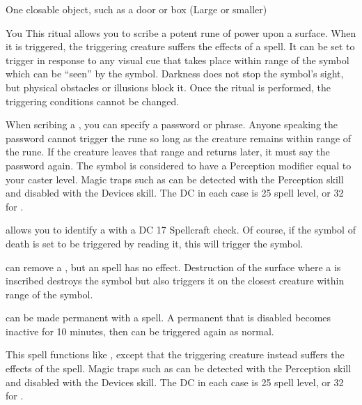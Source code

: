 \begin{spelltarget}{One closable object, such as a door or box (Large or smaller)}
\begin{spelltarget}{You}
\spelleffect This ritual allows you to scribe a potent rune of power upon a surface. When it is triggered, the triggering creature suffers the effects of a  spell. It can be set to trigger in response to any visual cue that takes place within \rngclose range of the symbol which can be ``seen'' by the symbol. Darkness does not stop the symbol's sight, but physical obstacles or illusions block it. Once the ritual is performed, the triggering conditions cannot be changed.
\par When scribing a , you can specify a password or phrase. Anyone speaking the password cannot trigger the rune so long as the creature remains within \rngmed range of the rune. If the creature leaves that range and returns later, it must say the password again.
\spellnotes The symbol is considered to have a Perception modifier equal to your caster level. Magic traps such as  can be detected with the Perception skill and disabled with the Devices skill. The DC in each case is 25 \add spell level, or 32 for .
\par {} allows you to identify a  with a DC 17 Spellcraft check. Of course, if the symbol of death is set to be triggered by reading it, this will trigger the symbol.
\par {} can remove a , but an  spell has no effect. Destruction of the surface where a  is inscribed destroys the symbol but also triggers it on the closest creature within \rngclose range of the symbol.
\par {} can be made permanent with a  spell. A permanent  that is disabled becomes inactive for 10 minutes, then can be triggered again as normal.

\spelleffect This spell functions like , except that the triggering creature instead suffers the effects of the  spell.
\spellnotes Magic traps such as  can be detected with the Perception skill and disabled with the Devices skill. The DC in each case is 25 \add spell level, or 32 for .


\end{spelltarget}
\end{spelltarget}
